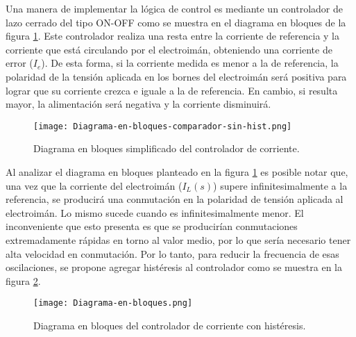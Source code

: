 Una manera de implementar la lógica de control es mediante un controlador de lazo cerrado del tipo ON-OFF como se muestra en el diagrama en bloques de la figura \ref{fig:img_diag-en-bloques-comparador-sin-hist}. Este controlador realiza una resta entre la corriente de referencia y la corriente que está circulando por el electroimán, obteniendo una corriente de error ($I_e$). De esta forma, si la corriente medida es menor a la de referencia, la polaridad de la tensión aplicada en los bornes del electroimán será positiva para lograr que su corriente crezca e iguale a la de referencia. En cambio, si resulta mayor, la alimentación será negativa y la corriente disminuirá.

\begin{figure}[H]
	\centering
	\texttt{[image: Diagrama-en-bloques-comparador-sin-hist.png]}
	\caption{Diagrama en bloques simplificado del controlador de corriente.}
	\label{fig:img_diag-en-bloques-comparador-sin-hist}
\end{figure}







Al analizar el diagrama en bloques planteado en la figura \ref{fig:img_diag-en-bloques-comparador-sin-hist} es posible notar que, una vez que la corriente del electroimán ($I_{L}(s)$) supere infinitesimalmente a la referencia, se producirá una conmutación en la polaridad de tensión aplicada al electroimán. Lo mismo sucede cuando es infinitesimalmente menor. El inconveniente que esto presenta es que se producirían conmutaciones extremadamente rápidas en torno al valor medio, por lo que sería necesario tener alta velocidad en conmutación. Por lo tanto, para reducir la frecuencia de esas oscilaciones, se propone agregar histéresis al controlador como se muestra en la figura \ref{fig:img_diag-en-bloques}.

\begin{figure}[H]
	\centering
	\texttt{[image: Diagrama-en-bloques.png]}
	\caption{Diagrama en bloques del controlador de corriente con histéresis.}
	\label{fig:img_diag-en-bloques}
\end{figure}

